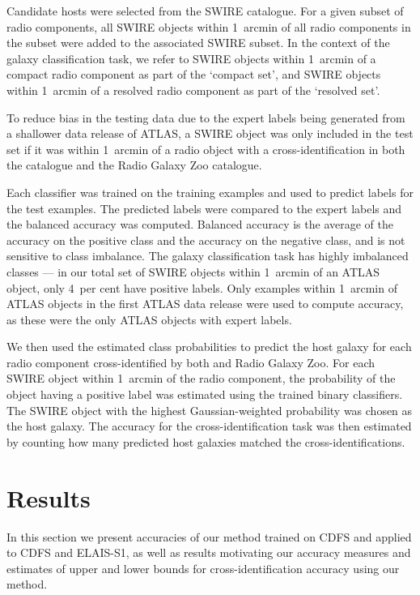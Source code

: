 \documentclass[fleqn,usenatbib,usedcolumn]{mnras}
\begin{document}
    Candidate hosts were selected from the SWIRE catalogue. For a given subset
    of radio components, all SWIRE objects within 1~arcmin of all radio
    components in the subset were added to the associated SWIRE subset. In the
    context of the galaxy classification task, we refer to SWIRE objects
    within 1~arcmin of a compact radio component as part of the `compact set',
    and SWIRE objects within 1~arcmin of a resolved radio component as part of
    the `resolved set'.

    To reduce
    bias in the testing data due to the expert labels being generated from a
    shallower data release of ATLAS, a SWIRE object was only included in the test
    set if it was within 1~arcmin of a radio object with a cross-identification
    in both the \citet{norris06} catalogue and the Radio Galaxy Zoo catalogue.

    Each classifier was trained on the training examples and used to predict
    labels for the test examples. The predicted labels were compared to the
    expert labels and the balanced accuracy was computed. Balanced accuracy is the average of the accuracy on the positive class and the accuracy on the negative class, and is not sensitive to class imbalance. The galaxy classification task has highly imbalanced classes --- in
    our total set of SWIRE objects within 1~arcmin of an ATLAS object, only
    4~per cent have positive labels.
    Only examples within 1~arcmin of ATLAS
    objects in the first ATLAS data release \citep{norris06} were used to
    compute accuracy, as these were the only ATLAS objects with expert labels.

    We then used the estimated class probabilities to predict the host galaxy for
    each radio component cross-identified by both \citet{norris06} and Radio
    Galaxy Zoo. For each SWIRE object within 1~arcmin of the radio component,
    the probability of the object having a positive label was estimated using
    the trained binary classifiers. The SWIRE object with the highest Gaussian-weighted
    probability was chosen as the host galaxy. The accuracy for the cross-identification task was then estimated
    by counting how many predicted host galaxies matched the \citet{norris06}
    cross-identifications.

\section{Results}\label{sec:results}

  In this section we present accuracies of our method trained on CDFS and
  applied to CDFS and ELAIS-S1, as well as results motivating our accuracy
  measures and estimates of upper and lower
  bounds for cross-identification accuracy using our method.
\end{document}
